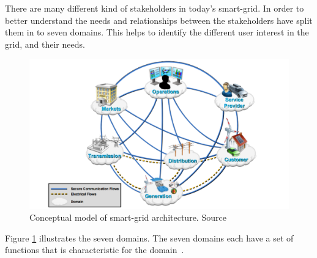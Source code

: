 There are many different kind of stakeholders in today's smart-grid. In order to better understand the needs and relationships between the stakeholders have  split them in to seven domains. This helps to identify the different user interest in the grid, and their needs.  

\newpage %

\begin{figure}[H]
\centering
\includegraphics[width=1\textwidth]{billeder/SMARTGRID.png}
\caption{Conceptual model of smart-grid architecture. Source~\citep{RefWorks:41}}
\label{fig:CMOSG}
\end{figure}
 
Figure \ref{fig:CMOSG} illustrates the seven domains. The seven domains each have a set of functions that is characteristic for the domain~\citep{RefWorks:41}.  
 

